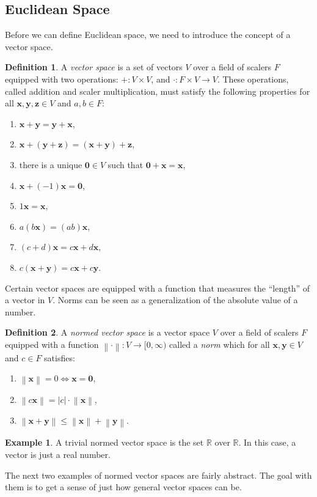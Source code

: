 \documentclass{article}
\newcommand{\R}{\mathbb{R}}
\newcommand{\x}{\mathbf{x}}
\newcommand{\y}{\mathbf{y}}
\newcommand{\z}{\mathbf{z}}
\newcommand{\ze}{\mathbf{0}}
\newcommand{\norm}[1]{\left\lVert#1\right\rVert}
\theoremstyle{definition}
\newtheorem{definition}{Definition}[section]
\newtheorem{example}{Example}[section]
\begin{document}
\subsection{Euclidean Space}
Before we can define Euclidean space, we need to introduce the concept of a vector space. 
\begin{definition}
	A \textit{\color{red}vector space} is a set of vectors $ V $ over a field of scalers $ F $ equipped with two operations: $ +:V\times V $, and $ \cdot:F\times V\to V $. These operations, called addition and scaler multiplication, must satisfy the following properties for all $ \x,\y,\mathbf{z}\in V $ and $ a,b\in F $:
	\begin{enumerate}
		\item $ \x+\y=\y+\x $,
		\item $ \x+(\y+\z)=(\x+\y)+\z $,
		\item there is a unique $ \mathbf{0}\in V $ such that $ \ze+\x=\x $,
		\item $ \x+(-1)\x=\ze $,
		\item $ 1\x=\x $,
		\item $ a(b\x)=(ab)\x $,
		\item $ (c+d)\x=c\x+d\x $,
		\item $ c(\x+\y)=c\x+c\y $.
	\end{enumerate}
\end{definition}
Certain vector spaces are equipped with a function that measures the ``length'' of a vector in $ V $. Norms can be seen as a generalization of the absolute value of a number.
\begin{definition}
	A \textit{\color{red}normed vector space} is a vector space $ V $ over a field of scalers $ F $ equipped with a function $\norm{\cdot}:V\to[0,\infty)$ called a \textit{\color{red}norm} which for all $ \x,\y\in V $ and $ c\in F $ satisfies:
	\begin{enumerate}
		\item $ \norm{\x}=0\iff \x=\ze$,
		\item $ \norm{c\x}=|c|\cdot \norm{\x} $,
		\item $ \norm{\x+\y}\le\norm{\x}+\norm{\y} $.
	\end{enumerate} 
\end{definition}
\begin{example}
	A trivial normed vector space is the set $ \R $ over $ \R $. In this case, a vector is just a real number. 
\end{example}
The next two examples of normed vector spaces are fairly abstract. The goal with them is to get a sense of just how general vector spaces can be.
\end{document}
